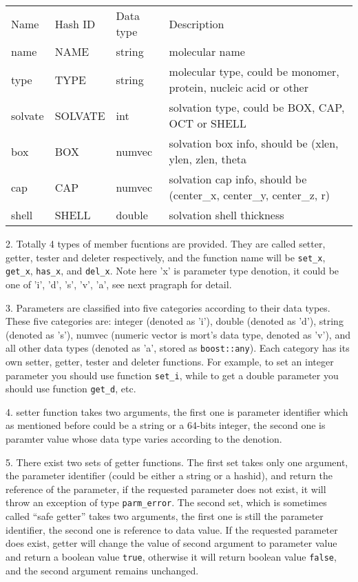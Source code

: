 \documentclass[letterpaper]{book}
\begin{document}
\begin{tabular}{llll}

Name      &  Hash ID    &  Data type  & Description      \\
name      &  NAME       &  string     & molecular name   \\
type      &  TYPE       &  string     & molecular type, could be monomer, protein, nucleic acid or other \\
solvate   &  SOLVATE    &  int        & solvation type, could be BOX, CAP, OCT or SHELL \\
box       &  BOX        &  numvec     & solvation box info, should be (xlen, ylen, zlen, theta \\
cap       &  CAP        &  numvec     & solvation cap info, should be (center\_x, center\_y, center\_z, r) \\
shell     &  SHELL      &  double     & solvation shell thickness
\end{tabular}

  2. Totally 4 types of member fucntions are provided. They are called setter, getter, tester
and deleter respectively, and the function name will be \lstinline$set_x$, \lstinline$get_x$,
\lstinline$has_x$, and \lstinline$del_x$. Note here 'x' is parameter type denotion, it could
be one of 'i', 'd', 's', 'v', 'a', see next pragraph for detail.

  3. Parameters are classified into five categories according to their data types. These five
categories are: integer (denoted as 'i'), double (denoted as 'd'), string (denoted as 's'), 
numvec (numeric vector is mort's data type, denoted as 'v'), and all other data types (denoted
as 'a', stored as \lstinline$boost::any$). Each category has its own setter, getter, tester
and deleter functions. For example, to set an integer parameter you should use function
\lstinline$set_i$, while to get a double parameter you should use function \lstinline$get_d$,
etc.

  4. setter function takes two arguments, the first one is parameter identifier which as 
mentioned before could be a string or a 64-bits integer, the second one is paramter value
whose data type varies according to the denotion.

  5. There exist two sets of getter functions. The first set takes only one argument, the
parameter identifier (could be either a string or a hashid), and return the reference
of the parameter, if the requested parameter does not exist, it will throw an exception of
type \lstinline$parm_error$. The second set, which is sometimes called ``safe getter'' takes 
two arguments, the first one is still the parameter identifier, the second one is reference to
data value. If the requested parameter does exist, getter will change the value of second argument 
to parameter value and return a boolean value \lstinline$true$, otherwise it will return 
boolean value \lstinline$false$, and the second argument remains unchanged.
\end{document}
